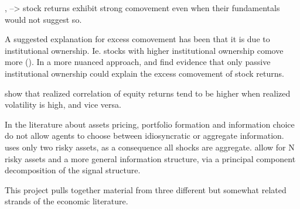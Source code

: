 \vspace{1cm}

\textcite{Barberis2005}, \textcite{Greenwood2008} --> stock returns exhibit strong comovement even when their fundamentals would not suggest so. 

\vspace{1cm}

A suggested explanation for excess comovement has been that it is due to institutional ownership. Ie. stocks with higher institutional ownership comove more (\cite{Pindyck1993}). In a more nuanced approach, \textcite{Kacperczyk2012} and \textcite{Kacperczyk2016} find evidence that only passive institutional ownership could explain the excess comovement of stock returns.

\vspace{1cm}

\textcite{Andersen2000} show that realized correlation of equity returns tend to be higher when realized volatility is high, and vice versa.

\vspace{1cm}

In the literature about assets pricing, portfolio formation and information choice \textcite{VanNieuwerburgh2010} do not allow agents to choose between idiosyncratic or aggregate information. \textcite{Mondria2010} uses only two risky assets, as a consequence all shocks are aggregate. \textcite{Kacperczyk2016} allow for N risky assets and a more general information structure, via a principal component decomposition of the signal structure.

This project pulls together material from three different but somewhat related strands of the economic literature. 